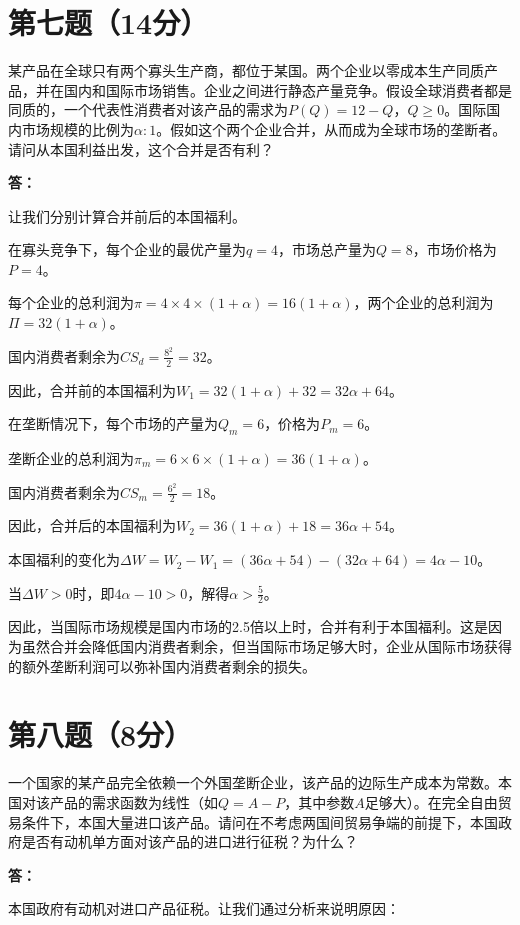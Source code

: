 \documentclass[12pt]{article}
\begin{document}
\section*{第七题（14分）}
某产品在全球只有两个寡头生产商，都位于某国。两个企业以零成本生产同质产品，并在国内和国际市场销售。企业之间进行静态产量竞争。假设全球消费者都是同质的，一个代表性消费者对该产品的需求为$P(Q)=12-Q$，$Q\geq0$。国际国内市场规模的比例为$\alpha:1$。假如这个两个企业合并，从而成为全球市场的垄断者。请问从本国利益出发，这个合并是否有利？

\noindent \textbf{答：}

让我们分别计算合并前后的本国福利。

在寡头竞争下，每个企业的最优产量为$q=4$，市场总产量为$Q=8$，市场价格为$P=4$。

每个企业的总利润为$\pi=4\times4\times(1+\alpha)=16(1+\alpha)$，两个企业的总利润为$\Pi=32(1+\alpha)$。

国内消费者剩余为$CS_d=\frac{8^2}{2}=32$。

因此，合并前的本国福利为$W_1=32(1+\alpha)+32=32\alpha+64$。

在垄断情况下，每个市场的产量为$Q_m=6$，价格为$P_m=6$。

垄断企业的总利润为$\pi_m=6\times6\times(1+\alpha)=36(1+\alpha)$。

国内消费者剩余为$CS_m=\frac{6^2}{2}=18$。

因此，合并后的本国福利为$W_2=36(1+\alpha)+18=36\alpha+54$。

本国福利的变化为$\Delta W=W_2-W_1=(36\alpha+54)-(32\alpha+64)=4\alpha-10$。

当$\Delta W>0$时，即$4\alpha-10>0$，解得$\alpha>\frac{5}{2}$。

因此，当国际市场规模是国内市场的2.5倍以上时，合并有利于本国福利。这是因为虽然合并会降低国内消费者剩余，但当国际市场足够大时，企业从国际市场获得的额外垄断利润可以弥补国内消费者剩余的损失。

\section*{第八题（8分）}
一个国家的某产品完全依赖一个外国垄断企业，该产品的边际生产成本为常数。本国对该产品的需求函数为线性（如$Q=A-P$，其中参数$A$足够大）。在完全自由贸易条件下，本国大量进口该产品。请问在不考虑两国间贸易争端的前提下，本国政府是否有动机单方面对该产品的进口进行征税？为什么？

\noindent \textbf{答：}

本国政府有动机对进口产品征税。让我们通过分析来说明原因：
\end{document}
